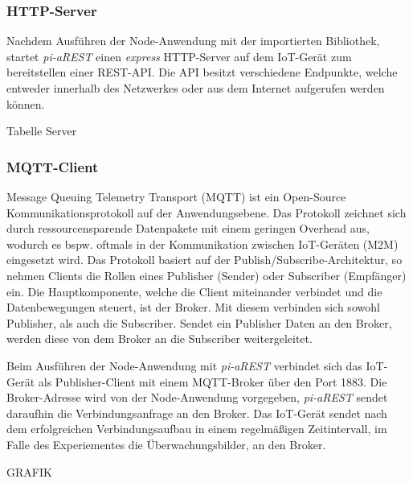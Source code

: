 \subsubsection{HTTP-Server}
Nachdem Ausführen der Node-Anwendung mit der importierten Bibliothek, startet \textit{pi-aREST} einen 
\textit{express} HTTP-Server auf dem IoT-Gerät zum bereitstellen einer REST-API. Die API besitzt
verschiedene Endpunkte, welche entweder innerhalb des Netzwerkes oder aus dem Internet aufgerufen werden
können. 

Tabelle Server

\subsubsection{MQTT-Client}
Message Queuing Telemetry Transport (MQTT) ist ein Open-Source Kommunikationsprotokoll auf der
Anwendungsebene. Das Protokoll zeichnet sich durch ressourcensparende Datenpakete mit einem 
geringen Overhead aus, wodurch es bspw. oftmals in der Kommunikation zwischen IoT-Geräten (M2M) 
eingesetzt wird. Das Protokoll basiert auf der Publish/Subscribe-Architektur, so nehmen Clients
die Rollen eines Publisher (Sender) oder Subscriber (Empfänger) ein. Die Hauptkomponente, welche
die Client miteinander verbindet und die Datenbewegungen steuert, ist der Broker.  Mit diesem
verbinden sich sowohl Publisher, als auch die Subscriber. Sendet ein Publisher Daten an den Broker,
werden diese von dem Broker an die Subscriber weitergeleitet. 

Beim Ausführen der Node-Anwendung mit \textit{pi-aREST} verbindet sich das IoT-Gerät als Publisher-Client
mit einem MQTT-Broker über den Port 1883. Die Broker-Adresse wird von der Node-Anwendung vorgegeben,
\textit{pi-aREST} sendet daraufhin die Verbindungsanfrage an den Broker. Das IoT-Gerät sendet nach dem 
erfolgreichen Verbindungsaufbau in einem regelmäßigen Zeitintervall, im Falle des Experiementes die 
Überwachungsbilder, an den Broker.



GRAFIK


